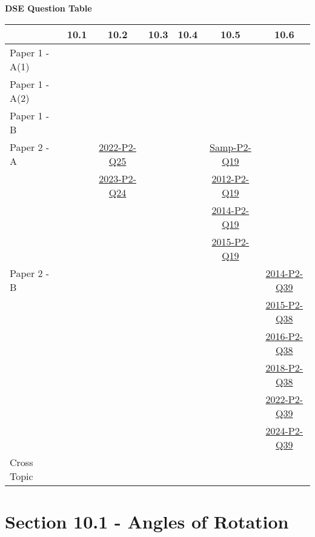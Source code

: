 \documentclass[12pt, a4paper]{article}
\begin{document}
\begin{absolutelynopagebreak}
\begin{center}
\textbf{DSE Question Table}
\end{center}
\begin{center}
\begin{tabular}{|l|c|c|c|c|c|c|}
\hline
        & 10.1 & 10.2 & 10.3 & 10.4 & 10.5 & 10.6 \\\hline
\hline
Paper 1 - A(1)&  &  &  &  &  &  \\
\hline
Paper 1 - A(2)&  &  &  &  &  &  \\
\hline
Paper 1 - B&  &  &  &  &  &  \\
\hline
\hline
Paper 2 - A&  & \hyperref[DSE2022-CoreP2-Q25]{2022-P2-Q25} &  &  & \hyperref[DSE2012S-CoreP2-Q19]{Samp-P2-Q19} &  \\
&  & \hyperref[DSE2023-CoreP2-Q24]{2023-P2-Q24} &  &  & \hyperref[DSE2012-CoreP2-Q19]{2012-P2-Q19} &  \\
&  &  &  &  & \hyperref[DSE2014-CoreP2-Q19]{2014-P2-Q19} &  \\
&  &  &  &  & \hyperref[DSE2015-CoreP2-Q19]{2015-P2-Q19} &  \\
\hline
Paper 2 - B&  &  &  &  &  & \hyperref[DSE2014-CoreP2-Q39]{2014-P2-Q39} \\
&  &  &  &  &  & \hyperref[DSE2015-CoreP2-Q38]{2015-P2-Q38} \\
&  &  &  &  &  & \hyperref[DSE2016-CoreP2-Q38]{2016-P2-Q38} \\
&  &  &  &  &  & \hyperref[DSE2018-CoreP2-Q38]{2018-P2-Q38} \\
&  &  &  &  &  & \hyperref[DSE2022-CoreP2-Q39]{2022-P2-Q39} \\
&  &  &  &  &  & \hyperref[DSE2024-CoreP2-Q39]{2024-P2-Q39} \\
\hline
\hline
Cross Topic&  &  &  &  &  &  \\
\hline
\end{tabular}
\end{center}
\end{absolutelynopagebreak}




\section*{Section 10.1 - Angles of Rotation }\label{section:4-10-1}





\end{document}
